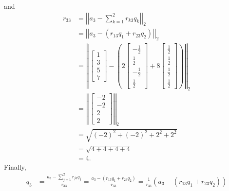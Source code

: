 \documentclass[letterpaper]{article}
\newcommand{\0}{\mathbf{0}}
\begin{document}
\begin{mdframed}
    \begin{mdframed}
        and 
        \begin{equation*}
            \begin{aligned}
                r_{33} &= \left|\left| a_3 - \sum_{k = 1}^{2} r_{k3} q_k \right|\right|_2 \\ 
                    &= \left|\left| a_3 - (r_{13} q_1 + r_{23} q_2) \right|\right|_2 \\ 
                    &= \left|\left| \begin{bmatrix}
                        1 \\ 3 \\ 5 \\ 7
                    \end{bmatrix} - \left(2 \begin{bmatrix}
                        -\frac{1}{2} \\ \frac{1}{2} \\ -\frac{1}{2} \\ \frac{1}{2}
                    \end{bmatrix} + 8 \begin{bmatrix}
                        \frac{1}{2} \\ \frac{1}{2} \\ \frac{1}{2} \\ \frac{1}{2}
                    \end{bmatrix}\right) \right|\right|_2 \\ 
                    &= \left|\left| \begin{bmatrix}
                        -2 \\ -2 \\ 2 \\ 2
                    \end{bmatrix} \right|\right|_2 \\ 
                    &= \sqrt{(-2)^2 + (-2)^2 + 2^2 + 2^2} \\ 
                    &= \sqrt{4 + 4 + 4 + 4} \\ 
                    &= 4.
            \end{aligned}
        \end{equation*}
        Finally,
        \begin{equation*}
            \begin{aligned}
                q_3 &= \frac{a_3 - \sum_{j = 1}^{2} r_{j3}q_j}{r_{33}} = \frac{a_3 - (r_{13}q_1 + r_{23}q_2)}{r_{33}} = \frac{1}{r_{33}} (a_3 - (r_{13}q_1 + r_{23}q_2)) \\ 

\end{aligned}
\end{equation*}
\end{mdframed}
\end{mdframed}
\end{document}
